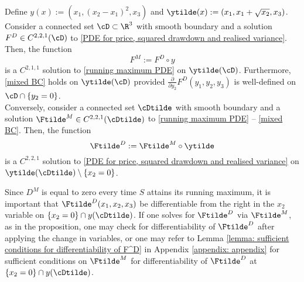 \documentclass[11pt]{article}
\begin{document}
\begin{proposition}
\label{proposition: equivalence between F^M and F^D}
Define $y(x) := (x_1, (x_2 - x_1)^2, x_3)$ and $\ytilde(x) := (x_1, x_1 + \sqrt{x_2}, x_3)$. \\
Consider a connected set $\cD \subset \R^3$ with smooth boundary and a solution $F^D \in C^{2,2,1}(\cD)$ to \eqref{PDE for price, squared drawdown and realised variance}. Then, the function
\begin{equation}
\label{F^D to F^M}
F^M := F^D \circ y
\end{equation}
is a $C^{2,1,1}$ solution to \eqref{running maximum PDE} on $\ytilde(\cD)$. Furthermore, \eqref{mixed BC} holds on $\ytilde(\cD)$ provided $\frac{\partial}{\partial y_2} F^D(y_1, y_2, y_3)$ is well-defined on $\cD \cap \{y_2 = 0\}$. \\
Conversely, consider a connected set $\cDtilde$ with smooth boundary and a solution $\Ftilde^M \in C^{2,2,1}(\cDtilde)$ to \eqref{running maximum PDE} -- \eqref{mixed BC}. Then, the function
$$
\Ftilde^D := \Ftilde^M \circ \ytilde
$$
is a $C^{2,2,1}$ solution to \eqref{PDE for price, squared drawdown and realised variance} on $\ytilde(\cDtilde) \setminus \{x_2 = 0\}$. 
\end{proposition}

Since $D^M$ is equal to zero every time $S$ attains its running maximum, it is important that $\Ftilde^D(x_1,x_2,x_3)$ be differentiable from the right in the $x_2$ variable on $\{x_2 = 0\} \cap y(\cDtilde)$. If one solves for $\Ftilde^D$ via $\Ftilde^M$, as in the proposition, one may check for differentiability of $\Ftilde^D$ after applying the change in variables, or one may refer to Lemma \ref{lemma: sufficient conditions for differentiability of F^D} in Appendix \ref{appendix: appendix} for sufficient conditions on $\Ftilde^M$ for differentiability of $\Ftilde^D$ at $\{x_2 = 0\} \cap y(\cDtilde)$.
\end{document}
